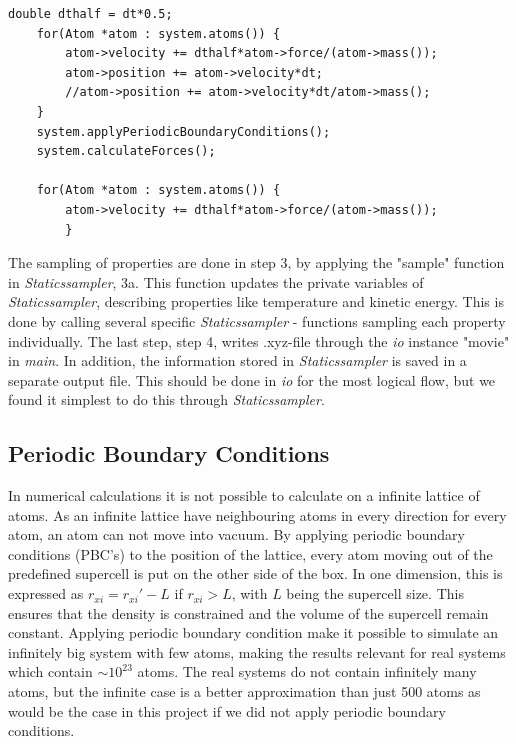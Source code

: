\begin{lstlisting}[caption = {Snippet showing the main part of velocity verlet algorithm as applied in \textit{VelocityVerlet}}, label = {listing}]
	double dthalf = dt*0.5;
	for(Atom *atom : system.atoms()) {
		atom->velocity += dthalf*atom->force/(atom->mass());
		atom->position += atom->velocity*dt; 
		//atom->position += atom->velocity*dt/atom->mass();
	}
	system.applyPeriodicBoundaryConditions();
	system.calculateForces();
	
	for(Atom *atom : system.atoms()) {
		atom->velocity += dthalf*atom->force/(atom->mass());
		}

\end{lstlisting}		
 
 The sampling of properties are done in step 3, by applying the "sample" function in \textit{Staticssampler}, 3a. This function updates the private variables of  \textit{Staticssampler}, describing properties like temperature and kinetic energy. This is done by calling several specific \textit{Staticssampler} - functions sampling each property individually. The last step, step 4, writes .xyz-file through the \textit{io} instance "movie" in \textit{main}. In addition, the information stored in \textit{Staticssampler} is saved in a separate output file. This should be done in \textit{io} for the most logical flow, but we found it simplest to do this through \textit{Staticssampler}. 
  
\subsection{Periodic Boundary Conditions}

In numerical calculations it is not possible to calculate on a infinite lattice of atoms. As an infinite lattice have neighbouring atoms in every direction for every atom, an atom can not move into vacuum. By applying periodic boundary conditions (PBC's) to the position of the lattice, every atom moving out of the predefined supercell is put on the other side of the box. In one dimension, this is expressed as $ r_{xi} = r_{xi}' - L $ if $ r_{xi} >L $, with $ L $ being the supercell size. This ensures that the density is constrained and the volume of the supercell remain constant. Applying periodic boundary condition make it possible to simulate an infinitely big system with few atoms, making the results relevant for real systems which contain $\sim 10^{23}$ atoms. The real systems do not contain infinitely many atoms, but the infinite case is a better approximation than just 500 atoms as would be the case in this project if we did not apply periodic boundary conditions.

